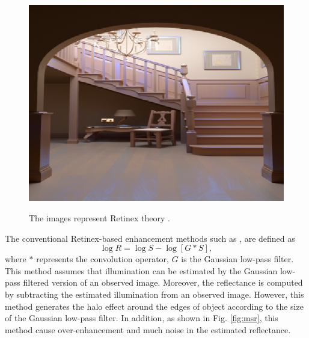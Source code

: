 \begin{figure}[tb]
\begin{minipage}[b]{0.32\hsize}
		\includegraphics[height=0.75\hsize]{images/retinex/illumination.eps}
		 \label{fig:retinex/illumination}
	\end{minipage}
\caption{The images represent Retinex theory \cite{arpr}.}
\label{fig:retinex}
\end{figure}

The conventional Retinex-based enhancement methods such as \cite{ssr}, \cite{msr} are defined as
\begin{equation}
\log{R} = \log{S} - \log{[G \ast S]}, \label{eq:log_retinex}
\end{equation}
where $\ast$ represents the convolution operator, $G$ is the Gaussian low-pass filter. This method assumes that illumination can be estimated by the Gaussian low-pass filtered version of an observed image. Moreover, the reflectance is computed by subtracting the estimated illumination from an observed image. However, this method generates the halo effect around the edges of object according to the size of the Gaussian low-pass filter. In addition, as shown in Fig. \ref{fig:msr}, this method cause over-enhancement and much noise in the estimated reflectance. 

